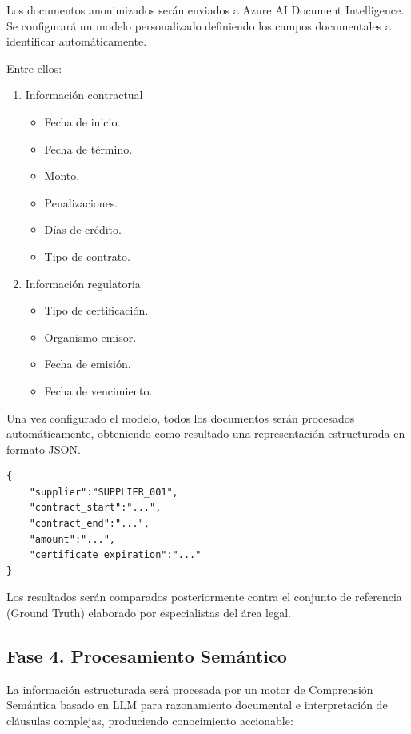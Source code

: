 \documentclass[12pt]{article}
\begin{document}
Los documentos anonimizados serán enviados a Azure AI Document Intelligence. Se configurará un modelo personalizado definiendo los campos documentales a identificar automáticamente.

Entre ellos:

\begin{enumerate}
\item Información contractual
\begin{itemize}
    \item Fecha de inicio.
    \item Fecha de término.
    \item Monto.
    \item Penalizaciones.
    \item Días de crédito.
    \item Tipo de contrato.
\end{itemize}

\item Información regulatoria
\begin{itemize}
    \item Tipo de certificación.
    \item Organismo emisor.
    \item Fecha de emisión.
    \item Fecha de vencimiento.
\end{itemize}
\end{enumerate}

Una vez configurado el modelo, todos los documentos serán procesados automáticamente, obteniendo como resultado una representación estructurada en formato JSON.

\begin{verbatim}
{
    "supplier":"SUPPLIER_001",
    "contract_start":"...",
    "contract_end":"...",
    "amount":"...",
    "certificate_expiration":"..."
}
\end{verbatim}

Los resultados serán comparados posteriormente contra el conjunto de referencia (Ground Truth) elaborado por especialistas del área legal.

\subsection{Fase 4. Procesamiento Semántico}

La información estructurada será procesada por un motor de Comprensión Semántica basado en LLM para razonamiento documental e interpretación de cláusulas complejas, produciendo conocimiento accionable:
\end{document}
